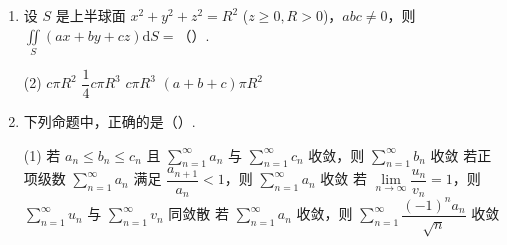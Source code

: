 \documentclass[../main.tex]{subfiles}
\begin{document}
\begin{enumerate}
        \begin{tasks}[label=\textbf{\Alph*.}, label-width=1.5em, column-sep=1em](1)
          \task \( I = 2\pi \displaystyle\int_0^1 r \mathrm{d}r \displaystyle\int_0^1 f(\sqrt{r^2 + z}) \mathrm{d}z \)
          \task \( I = 2\pi \displaystyle\int_0^1 r \mathrm{d}r \displaystyle \int_r^1 f(\sqrt{r^2 + z}) \mathrm{d}z \)
          \task \( I = 2\pi \displaystyle\int_0^1 \mathrm{d}r \displaystyle\int_r^1 f(\sqrt{r^2 + z}) \mathrm{d}z \)
          \task \( I = 2\pi \displaystyle\int_0^1 \mathrm{d}z \displaystyle \int_0^z f(\sqrt{r^2 + z}) \mathrm{d}r \)
        \end{tasks}

  \item 设 \( S \) 是上半球面 \( x^2 + y^2 + z^2 = R^2 \) (\( z \geq 0, R > 0 \))，\( abc \neq 0 \)，则 \( \displaystyle\iint \limits_S (ax + by + cz) \mathrm{d}S = \)（\qquad）.

        \begin{tasks}[label=\textbf{\Alph*.}, label-width=1.5em, column-sep=1em](2)
          \task \( c\pi R^2 \)
          \task \( \dfrac{1}{4}c\pi R^3 \)
          \task \( c\pi R^3 \)
          \task \( (a + b + c)\pi R^2 \)
        \end{tasks}
  \item 下列命题中，正确的是（\qquad）.

        \begin{tasks}[label=\textbf{\Alph*.}, label-width=1.5em, column-sep=1em](1)
          \task 若 \( a_n \leq b_n \leq c_n \) 且 \( \sum \limits_{n=1}^{\infty} a_n \) 与 \( \sum \limits_{n=1}^{\infty} c_n \) 收敛，则 \( \sum \limits_{n=1}^{\infty} b_n \) 收敛
          \task 若正项级数 \( \sum \limits_{n=1}^{\infty} a_n \) 满足 \( \dfrac{a_{n+1}}{a_n} < 1 \)，则 \( \sum \limits_{n=1}^{\infty} a_n \) 收敛
          \task 若 \( \lim \limits_{n \to \infty} \dfrac{u_n}{v_n} = 1 \)，则 \( \sum \limits_{n=1}^{\infty} u_n \) 与 \( \sum \limits_{n=1}^{\infty} v_n \) 同敛散
          \task 若 \( \sum \limits_{n=1}^{\infty} a_n \) 收敛，则 \( \sum \limits_{n=1}^{\infty} \dfrac{(-1)^n a_n}{\sqrt{n}} \) 收敛
        \end{tasks}

\end{enumerate}
\end{document}
